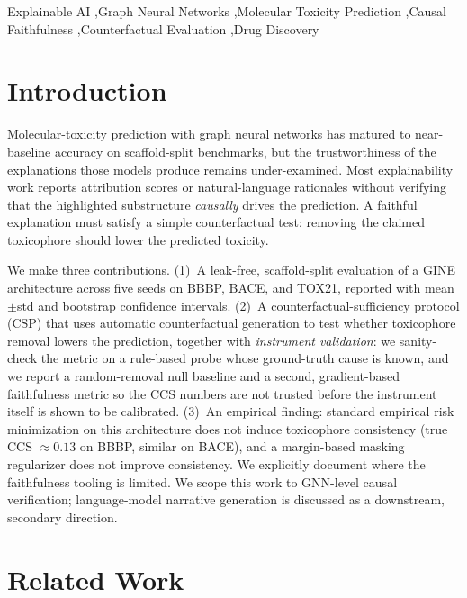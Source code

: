 \documentclass[a4paper,fleqn]{cas-dc}
\begin{document}
\begin{keywords}
Explainable AI \sep Graph Neural Networks \sep Molecular Toxicity Prediction \sep Causal Faithfulness \sep Counterfactual Evaluation \sep Drug Discovery
\end{keywords}

\maketitle

\section{Introduction}
Molecular-toxicity prediction with graph neural networks has matured to near-baseline accuracy on scaffold-split benchmarks, but the trustworthiness of the explanations those models produce remains under-examined. Most explainability work reports attribution scores or natural-language rationales without verifying that the highlighted substructure \emph{causally} drives the prediction. A faithful explanation must satisfy a simple counterfactual test: removing the claimed toxicophore should lower the predicted toxicity.

We make three contributions. (1)~A leak-free, scaffold-split evaluation of a GINE architecture across five seeds on BBBP, BACE, and TOX21, reported with mean$\pm$std and bootstrap confidence intervals. (2)~A counterfactual-sufficiency protocol (CSP) that uses automatic counterfactual generation to test whether toxicophore removal lowers the prediction, together with \emph{instrument validation}: we sanity-check the metric on a rule-based probe whose ground-truth cause is known, and we report a random-removal null baseline and a second, gradient-based faithfulness metric so the CCS numbers are not trusted before the instrument itself is shown to be calibrated. (3)~An empirical finding: standard empirical risk minimization on this architecture does not induce toxicophore consistency (true CCS $\approx 0.13$ on BBBP, similar on BACE), and a margin-based masking regularizer does not improve consistency. We explicitly document where the faithfulness tooling is limited. We scope this work to GNN-level causal verification; language-model narrative generation is discussed as a downstream, secondary direction.

\section{Related Work}
\end{document}

